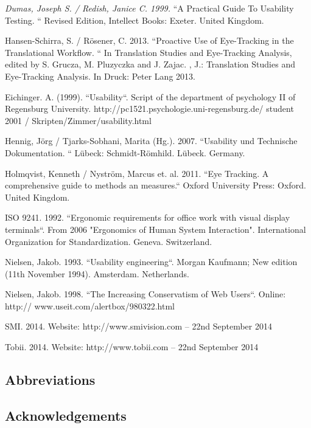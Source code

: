 \documentclass[output=paper]{langsci/langscibook}
\begin{document}
\emph{Dumas, Joseph S. / Redish, Janice C. 1999. }“A Practical Guide To Usability Testing. “ Revised Edition, Intellect Books: Exeter. United Kingdom.



Hansen-Schirra, S. / Rösener, C. 2013. “Proactive Use of Eye-Tracking in the Translational Workflow. “ In Translation Studies and Eye-Tracking Analysis, edited by S. Grucza, M. Pluzyczka and J. Zajac. , J.: Translation Studies and Eye-Tracking Analysis. In Druck: Peter Lang 2013.



Eichinger. A. (1999). “Usability“. Script of the department of psychology II of Regensburg University. http://pc1521.psychologie.uni-regensburg.de/ student 2001 / Skripten/Zimmer/usability.html



Hennig, Jörg / Tjarks-Sobhani, Marita (Hg.). 2007. “Usability und Technische Dokumentation. “ Lübeck: Schmidt-Römhild. Lübeck. Germany.



Holmqvist, Kenneth / Nyström, Marcus et. al. 2011. “Eye Tracking. A comprehensive guide to methods an measures.“ Oxford University Press: Oxford. United Kingdom.



ISO 9241. 1992. “Ergonomic requirements for office work with visual display terminals“. From 2006 "Ergonomics of Human System Interaction". International Organization for Standardization. Geneva. Switzerland.



Nielsen, Jakob. 1993. “Usability engineering“. Morgan Kaufmann; New edition (11th November 1994). Amsterdam. Netherlands.



Nielsen, Jakob. 1998. “The Increasing Conservatism of Web Users“. Online: http:// www.useit.com/alertbox/980322.html



SMI. 2014. Website: http://www.smivision.com – 22nd September 2014



Tobii. 2014. Website: http://www.tobii.com – 22nd September 2014



\subsection*{Abbreviations}
\subsection*{Acknowledgements}

\printbibliography[heading=subbibliography,notkeyword=this]
\end{document}
